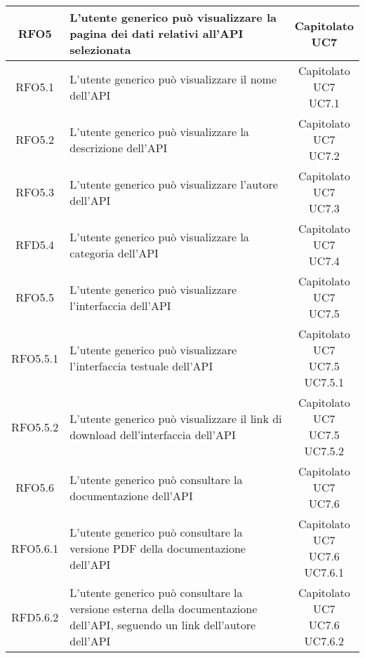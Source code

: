 \begin{longtable}{|c|p{8cm}|c|}
\hypertarget{RFO5}{RFO5} & L'utente generico può visualizzare la pagina dei dati relativi all'API selezionata & \makecell*{Capitolato\\UC7} \\
\hline

\hypertarget{RFO5.1}{RFO5.1} & L'utente generico può visualizzare il nome dell'API & \makecell*{Capitolato\\UC7\\UC7.1} \\
\hline
\hypertarget{RFO5.2}{RFO5.2} & L'utente generico può visualizzare la descrizione dell'API & \makecell*{Capitolato\\UC7\\UC7.2} \\
\hline
\hypertarget{RFO5.3}{RFO5.3} & L'utente generico può visualizzare l'autore dell'API & \makecell*{Capitolato\\UC7\\UC7.3} \\
\hline
\hypertarget{RFD5.4}{RFD5.4} & L'utente generico può visualizzare la categoria dell'API & \makecell*{Capitolato\\UC7\\UC7.4} \\
\hline

\hypertarget{RFO5.5}{RFO5.5} & L'utente generico può visualizzare l'interfaccia dell'API & \makecell*{Capitolato\\UC7\\UC7.5} \\
\hline
\hypertarget{RFO5.5.1}{RFO5.5.1} & L'utente generico può visualizzare l'interfaccia testuale dell'API & \makecell*{Capitolato\\UC7\\UC7.5\\UC7.5.1} \\
\hline
\hypertarget{RFO5.5.2}{RFO5.5.2} & L'utente generico può visualizzare il link di download dell'interfaccia dell'API & \makecell*{Capitolato\\UC7\\UC7.5\\UC7.5.2} \\
\hline

\hypertarget{RFO5.6}{RFO5.6} & L'utente generico può consultare la documentazione dell'API & \makecell*{Capitolato\\UC7\\UC7.6} \\
\hline
\hypertarget{RFO5.6.1}{RFO5.6.1} & L'utente generico può consultare la versione PDF della documentazione dell'API & \makecell*{Capitolato\\UC7\\UC7.6\\UC7.6.1} \\
\hline
\hypertarget{RFD5.6.2}{RFD5.6.2} & L'utente generico può consultare la versione esterna della documentazione dell'API, seguendo un link dell'autore dell'API  & \makecell*{Capitolato\\UC7\\UC7.6\\UC7.6.2} \\
\hline


\end{longtable}
